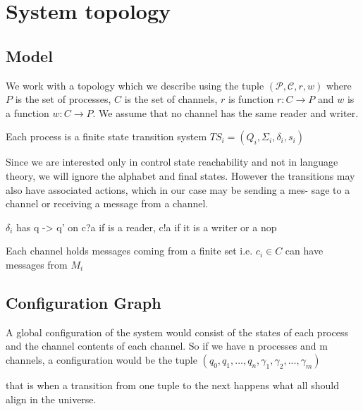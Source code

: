 \documentclass[a4paper,UKenglish,cleveref, autoref, thm-restate]{lipics-v2019}
\begin{document}






\section{System topology}

\subsection{Model}

We work with a topology which we describe using the tuple $(\mathcal{P}, \mathcal{C}, r, w)$ where $P$ is the set of processes, $C$ is the set of channels, $r$ is function $r:C \rightarrow P$ and $w$ is a function $w:C \rightarrow P$. 
We assume that no channel has the same reader and writer.

Each process is a finite state transition system $TS_i = (Q_i, \Sigma_i, \delta_i, s_i)$

Since we are interested only in control state reachability and not in language
theory, we will ignore the alphabet and final states. However the transitions
may also have associated actions, which in our case may be sending a mes-
sage to a channel or receiving a message from a channel. 


$\delta_i$ has q -> q' on  c?a if is a reader, c!a if it is a writer or a nop


Each channel holds messages coming from a finite set i.e. $c_i \in C$ can have messages from $M_i$ 

\subsection{Configuration Graph}

A global configuration of the system would consist of the states of each process and the channel contents of each channel. So if we have n processes and m channels, a configuration would be the tuple $(q_0, q_1, ..., q_n, \gamma_1, \gamma_2, ..., \gamma_m)$



that is when a transition from one tuple to the next happens what all should align in the universe.
\end{document}
